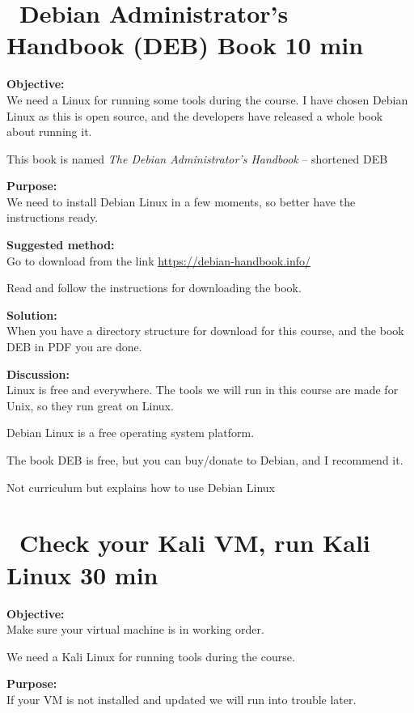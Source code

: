 \documentclass[a4paper,11pt,notitlepage]{report}
\begin{document}
\chapter{\faExclamationTriangle\ Debian Administrator’s Handbook (DEB) Book 10 min}
\label{ex:sw-downloadDEB}



{\bf Objective:}\\
We need a Linux for running some tools during the course. I have chosen Debian Linux as this is open source, and the developers have released a whole book about running it.

This book is named
\emph{The Debian Administrator’s Handbook}  -- shortened DEB

{\bf Purpose:}\\
We need to install Debian Linux in a few moments, so better have the instructions ready.

{\bf Suggested method:}\\
Go to download from the link \url{https://debian-handbook.info/}

Read and follow the instructions for downloading the book.

{\bf Solution:}\\
When you have a directory structure for download for this course, and the book DEB in PDF you are done.

{\bf Discussion:}\\
Linux is free and everywhere. The tools we will run in this course are made for Unix, so they run great on Linux.

Debian Linux is a free operating system platform.

The book DEB is free, but you can buy/donate to Debian, and I recommend it.

Not curriculum but explains how to use Debian Linux


\chapter{\faInfoCircle\ Check your Kali VM, run Kali Linux 30 min}
\label{ex:sw-basicVM}


{\bf Objective:}\\
Make sure your virtual machine is in working order.

We need a Kali Linux for running tools during the course.

{\bf Purpose:}\\
If your VM is not installed and updated we will run into trouble later.
\end{document}
